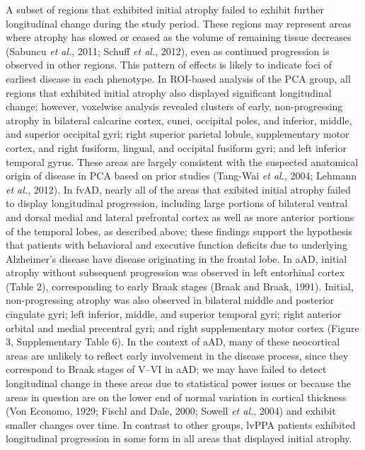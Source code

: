 \documentclass[]{article}
\begin{document}
A subset of regions that exhibited initial atrophy failed to exhibit
further longitudinal change during the study period. These regions may
represent areas where atrophy has slowed or ceased as the volume of
remaining tissue decreases (Sabuncu \emph{et al.}, 2011; Schuff \emph{et
al.}, 2012), even as continued progression is observed in other regions.
This pattern of effects is likely to indicate foci of earliest disease
in each phenotype. In ROI-based analysis of the PCA group, all regions
that exhibited initial atrophy also displayed significant longitudinal
change; however, voxelwise analysis revealed clusters of early,
non-progressing atrophy in bilateral calcarine cortex, cunei, occipital
poles, and inferior, middle, and superior occipital gyri; right superior
parietal lobule, supplementary motor cortex, and right fusiform,
lingual, and occipital fusiform gyri; and left inferior temporal gyrus.
These areas are largely consistent with the suspected anatomical origin
of disease in PCA based on prior studies (Tang-Wai \emph{et al.}, 2004;
Lehmann \emph{et al.}, 2012). In fvAD, nearly all of the areas that
exibited initial atrophy failed to display longitudinal progression,
including large portions of bilateral ventral and dorsal medial and
lateral prefrontal cortex as well as more anterior portions of the
temporal lobes, as described above; these findings support the
hypothesis that patients with behavioral and executive function deficits
due to underlying Alzheimer's disease have disease originating in the
frontal lobe. In aAD, initial atrophy without subsequent progression was
observed in left entorhinal cortex (Table 2), corresponding to early
Braak stages (Braak and Braak, 1991). Initial, non-progressing atrophy
was also observed in bilateral middle and posterior cingulate gyri; left
inferior, middle, and superior temporal gyri; right anterior orbital and
medial precentral gyri; and right supplementary motor cortex (Figure 3,
Supplementary Table 6). In the context of aAD, many of these neocortical
areas are unlikely to reflect early involvement in the disease process,
since they correspond to Braak stages of V--VI in aAD; we may have
failed to detect longitudinal change in these areas due to statistical
power issues or because the areas in question are on the lower end of
normal variation in cortical thickness (Von Economo, 1929; Fischl and
Dale, 2000; Sowell \emph{et al.}, 2004) and exhibit smaller changes over
time. In contrast to other groups, lvPPA patients exhibited longitudinal
progression in some form in all areas that displayed initial atrophy.
\end{document}
